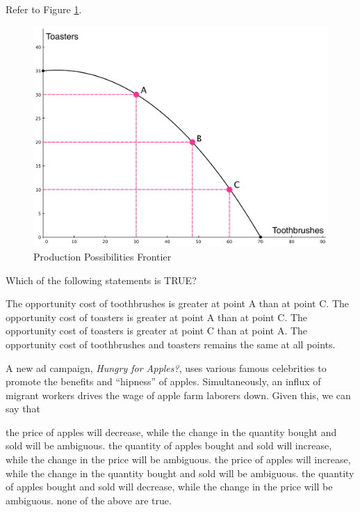 \documentclass[addpoints,11pt]{exam}
\theoremstyle{definition}
\begin{document}
\begin{questions}
	\question Refer to Figure \ref{fig1}. 

\begin{figure}[H]
	\centering
	\includegraphics[scale=.3]{hw1_plot1.pdf}
	\caption{Production Possibilities Frontier}
	\label{fig1}
\end{figure}

Which of the following statements is TRUE?

\begin{choices}
	\choice The opportunity cost of toothbrushes is greater at point A than at point C.
	\CorrectChoice The opportunity cost of toasters is greater at point A than at point C.
	\choice The opportunity cost of toasters is greater at point C than at point A.
	\choice The opportunity cost of toothbrushes and toasters remains the same at all points.
\end{choices}

\question A new ad campaign, \textit{Hungry for Apples?}, uses various famous celebrities to promote the benefits and ``hipness'' of apples. Simultaneously, an influx of migrant workers drives the wage of apple farm laborers down. Given this, we can say that

\begin{choices}
	\choice the price of apples will decrease, while the change in the quantity bought and sold will be ambiguous.
	\CorrectChoice the quantity of apples bought and sold will increase, while the change in the price will be ambiguous.
	\choice the price of apples will increase, while the change in the quantity bought and sold will be ambiguous.
	\choice the quantity of apples bought and sold will decrease, while the change in the price will be ambiguous.
	\choice none of the above are true.
\end{choices}


\end{questions}
\end{document}
